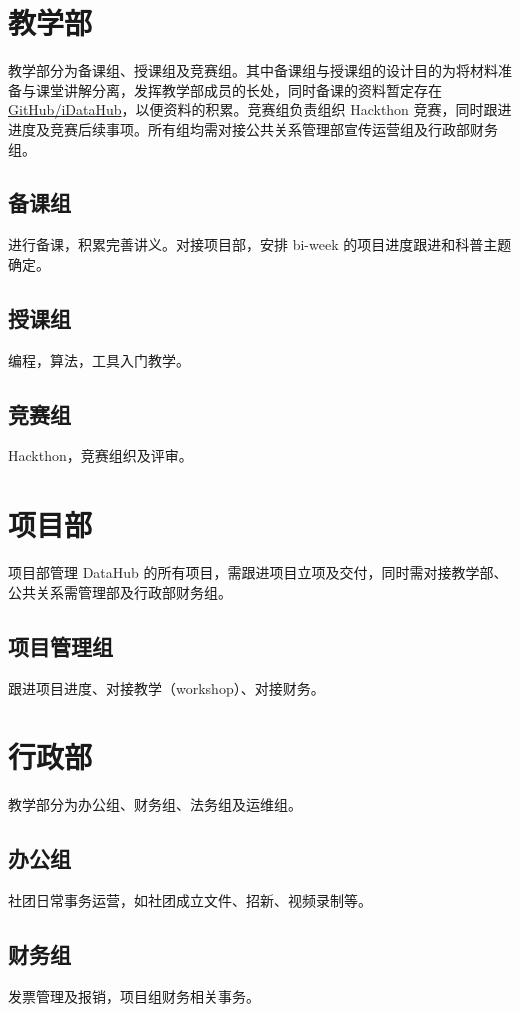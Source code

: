 \section{教学部}
    教学部分为备课组、授课组及竞赛组。其中备课组与授课组的设计目的为将材料准备与课堂讲解分离，发挥教学部成员的长处，同时备课的资料暂定存在 \href{https://github.com/iDataHub}{GitHub/iDataHub}，以便资料的积累。竞赛组负责组织 Hackthon 竞赛，同时跟进进度及竞赛后续事项。所有组均需对接公共关系管理部宣传运营组及行政部财务组。
    \subsection{备课组}
    进行备课，积累完善讲义。对接项目部，安排 bi-week 的项目进度跟进和科普主题确定。


    \subsection{授课组}
    编程，算法，工具入门教学。


    \subsection{竞赛组}
    Hackthon，竞赛组织及评审。



\section{项目部}
    项目部管理 DataHub 的所有项目，需跟进项目立项及交付，同时需对接教学部、公共关系需管理部及行政部财务组。
    \subsection{项目管理组}
    跟进项目进度、对接教学（workshop）、对接财务。



\section{行政部}
    教学部分为办公组、财务组、法务组及运维组。
    \subsection{办公组}
    社团日常事务运营，如社团成立文件、招新、视频录制等。


    \subsection{财务组}
    发票管理及报销，项目组财务相关事务。


